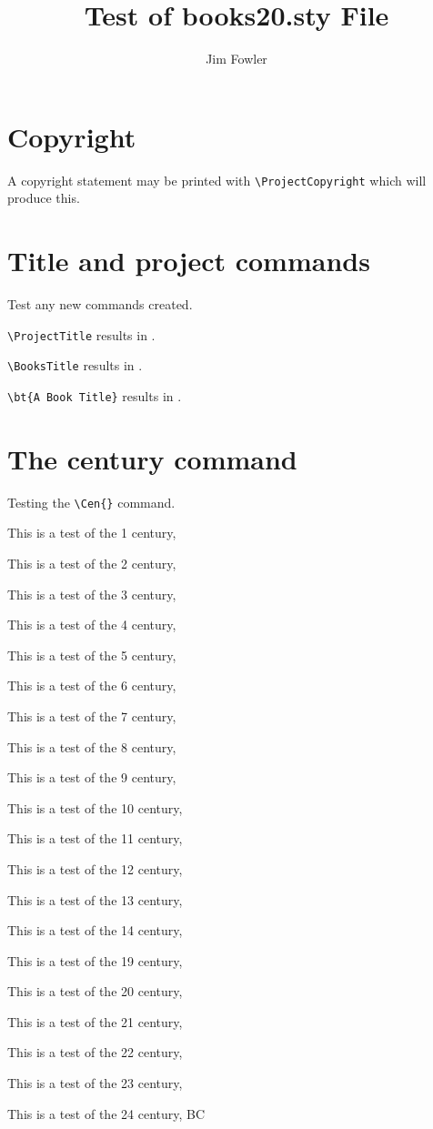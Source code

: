 \documentclass{article}
\begin{document}
\title{Test of books20.sty File}
\author{Jim Fowler}

\maketitle

\section{Copyright}

A copyright statement may be printed with \verb|\ProjectCopyright|
which will produce this.
\vspace{\baselineskip}


\section{Title and project commands}

Test any new commands created.

\verb|\ProjectTitle| results in \ProjectTitle.

\verb|\BooksTitle| results in \BookTitle.

\verb|\bt{A Book Title}| results in .

\section{The century command}

Testing the \verb|\Cen{}| command.

This is a test of the 1 century, 

This is a test of the 2 century, 

This is a test of the 3 century, 

This is a test of the 4 century, 

This is a test of the 5 century, 

This is a test of the 6 century, 

This is a test of the 7 century, 

This is a test of the 8 century, 

This is a test of the 9 century, 

This is a test of the 10 century, 

This is a test of the 11 century, 

This is a test of the 12 century, 

This is a test of the 13 century, 

This is a test of the 14 century, 

This is a test of the 19 century, 

This is a test of the 20 century, 

This is a test of the 21 century, 

This is a test of the 22 century, 

This is a test of the 23 century, 

This is a test of the 24 century,  BC
\end{document}
